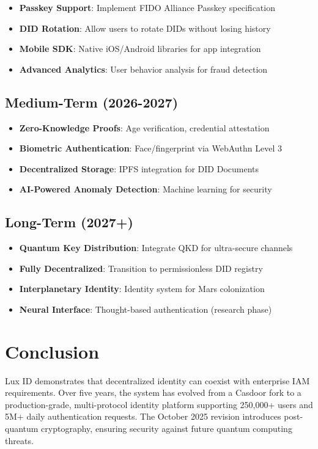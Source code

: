 \documentclass[11pt,a4paper]{article}
\begin{document}
\begin{itemize}
  \item \textbf{Passkey Support}: Implement FIDO Alliance Passkey specification
  \item \textbf{DID Rotation}: Allow users to rotate DIDs without losing history
  \item \textbf{Mobile SDK}: Native iOS/Android libraries for app integration
  \item \textbf{Advanced Analytics}: User behavior analysis for fraud detection
\end{itemize}

\subsection{Medium-Term (2026-2027)}

\begin{itemize}
  \item \textbf{Zero-Knowledge Proofs}: Age verification, credential attestation
  \item \textbf{Biometric Authentication}: Face/fingerprint via WebAuthn Level 3
  \item \textbf{Decentralized Storage}: IPFS integration for DID Documents
  \item \textbf{AI-Powered Anomaly Detection}: Machine learning for security
\end{itemize}

\subsection{Long-Term (2027+)}

\begin{itemize}
  \item \textbf{Quantum Key Distribution}: Integrate QKD for ultra-secure channels
  \item \textbf{Fully Decentralized}: Transition to permissionless DID registry
  \item \textbf{Interplanetary Identity}: Identity system for Mars colonization
  \item \textbf{Neural Interface}: Thought-based authentication (research phase)
\end{itemize}

\section{Conclusion}

Lux ID demonstrates that decentralized identity can coexist with enterprise IAM requirements. Over five years, the system has evolved from a Casdoor fork to a production-grade, multi-protocol identity platform supporting 250,000+ users and 5M+ daily authentication requests. The October 2025 revision introduces post-quantum cryptography, ensuring security against future quantum computing threats.
\end{document}
